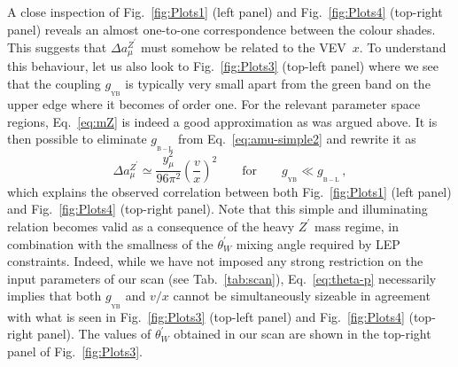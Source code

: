 \documentclass[10pt]{report}
\newcommand{\g}[2]{g_{_\mathrm{#1}}^{#2}}
\newcommand{\vev}[0]{VEV}
\begin{document}
A close inspection of Fig.~\ref{fig:Plots1} (left panel) and Fig.~\ref{fig:Plots4} (top-right panel) reveals an almost one-to-one correspondence between the colour shades. This suggests that $\Delta a_\mu^{Z^\prime}$ must somehow be related to the \vev~$x$. To understand this behaviour, let us also look to Fig.~\ref{fig:Plots3} (top-left panel) where we see that the coupling $\g{YB}{}$ is typically very small apart from the green band on the upper edge where it becomes of order one. For the relevant parameter space regions, Eq.~\eqref{eq:mZ} is indeed a good approximation as was argued above. It is then possible to eliminate $\g{B-L}{}$ from Eq.~\eqref{eq:amu-simple2} and rewrite it as
\begin{equation}
    \Delta a_\mu^{Z^\prime} \simeq \dfrac{y_\mu^2}{96 \pi^2} \left(\dfrac{v}{x}\right)^2 \qquad \text{for} \qquad \g{YB}{} \ll \g{B-L}{} \,,
    \label{eq:amu-vev}
\end{equation}
which explains the observed correlation between both Fig.~\ref{fig:Plots1} (left panel) and Fig.~\ref{fig:Plots4} (top-right panel).
Note that this simple and illuminating relation becomes valid as a consequence of the heavy $Z^\prime$ mass regime, in combination with the smallness of the $\theta_W^\prime$ mixing angle required by LEP constraints. Indeed, while we have not imposed any strong restriction on the input parameters of our scan (see Tab.~\ref{tab:scan}), Eq.~\eqref{eq:theta-p} necessarily implies that both $\g{YB}{}$ and $v/x$ cannot be simultaneously sizeable in agreement with what is seen in Fig.~\ref{fig:Plots3} (top-left panel) and Fig.~\ref{fig:Plots4} (top-right panel). The values of $\theta_W^\prime$ obtained in our scan are shown in the top-right panel of Fig.~\ref{fig:Plots3}.
\end{document}
